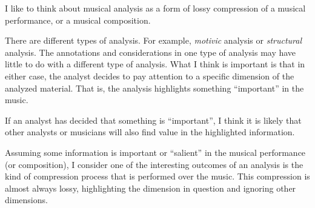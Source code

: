 

I like to think about musical analysis as a form of lossy compression of a musical performance, or a musical composition.

There are different types of analysis. For example, \emph{motivic} analysis or \emph{structural} analysis. The annotations and considerations in one type of analysis may have little to do with a different type of analysis. What I think is important is that in either case, the analyst decides to pay attention to a specific dimension of the analyzed material. That is, the analysis highlights something ``important'' in the music.


If an analyst has decided that something is ``important'', I think it is likely that other analysts or musicians will also find value in the highlighted information.


Assuming some information is important or ``salient'' in the musical performance (or composition), I consider one of the interesting outcomes of an analysis is the kind of compression process that is performed over the music. This compression is almost always lossy, highlighting the dimension in question and ignoring other dimensions.
